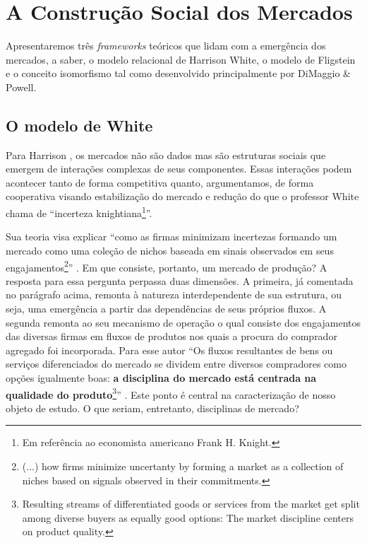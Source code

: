 \documentclass[a4paper, 12pt, openright, oneside, german, french, english, brazil]{abntex2}
\begin{document}
	\chapter{A Construção Social dos Mercados}
	
	Apresentaremos três \textit{frameworks} teóricos que lidam com a emergência dos mercados, a saber, o modelo relacional de Harrison White, o modelo de Fligstein e o conceito isomorfismo tal como desenvolvido principalmente por DiMaggio \& Powell.
	
	\section{O modelo de White}
	
	Para Harrison , os mercados não são dados mas são estruturas sociais que emergem de interações complexas de seus componentes. Essas interações podem acontecer tanto de forma competitiva quanto, argumentamos, de forma cooperativa visando estabilização do mercado e redução do que o professor White chama de ``incerteza knightiana\footnote{Em referência ao economista americano Frank H. Knight.}''.
	
	Sua teoria visa explicar ``como as firmas minimizam incertezas formando um mercado como uma coleção de nichos baseada em sinais observados em seus engajamentos\footnote{(...) how firms minimize uncertanty by forming a market as a collection of niches based on signals observed in their commitments.}'' \cite[p. xiii]{white2002markets}. Em que consiste, portanto, um mercado de produção? A resposta para essa pergunta perpassa duas dimensões. A primeira, já comentada no parágrafo acima, remonta à natureza interdependente de sua estrutura, ou seja, uma emergência a partir das dependências de seus próprios fluxos. A segunda remonta ao seu mecanismo de operação o qual consiste dos engajamentos das diversas firmas em fluxos de produtos nos quais a procura do comprador agregado foi incorporada. Para esse autor ``Os fluxos resultantes de bens ou serviços diferenciados do mercado se dividem entre diversos compradores como opções igualmente boas: \textbf{a disciplina do mercado está centrada na qualidade do produto}\footnote{Resulting streams of differentiated goods or services from the market get split among diverse buyers as equally good options: The market discipline centers on product quality.}'' \cite[p. 1, grifo meu]{white2002markets}. Este ponto é central na caracterização de nosso objeto de estudo. O que seriam, entretanto, disciplinas de mercado?
	
\end{document}
